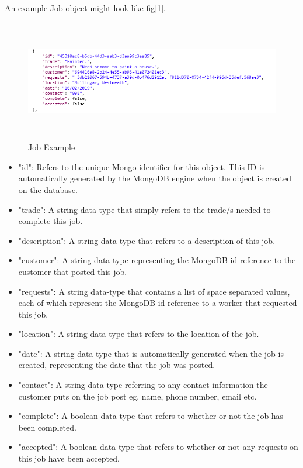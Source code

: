\bigskip

An example Job object might look like fig[\ref{fig:jobExample}].
\begin{figure}[H]
    \centering
    \includegraphics[width=\textwidth, height=150pt]{DesignImages/JobObject.PNG}
    \caption{Job Example}
    \label{fig:jobExample}
\end{figure}

\bigskip

\begin{itemize}

\item "id": Refers to the unique Mongo identifier for this object. This ID is automatically generated by the MongoDB engine when the object is created on the database.

\item "trade": A string data-type that simply refers to the trade/s needed to complete this job. 

\item "description": A string data-type that refers to a description of this job.

\item "customer": A string data-type representing the MongoDB id reference to the customer that posted this job.

\item "requests": A string data-type that contains a list of space separated values, each of which represent the MongoDB id reference to a worker that requested this job.

\item "location": A string data-type that refers to the location of the job.

\item "date": A string data-type that is automatically generated when the job is created, representing the date that the job was posted.

\item "contact": A string data-type referring to any contact information the customer puts on the job post eg. name, phone number, email etc.

\item "complete": A boolean data-type that refers to whether or not the job has been completed.

\item "accepted": A boolean data-type that refers to whether or not any requests on this job have been accepted.

\end{itemize}

